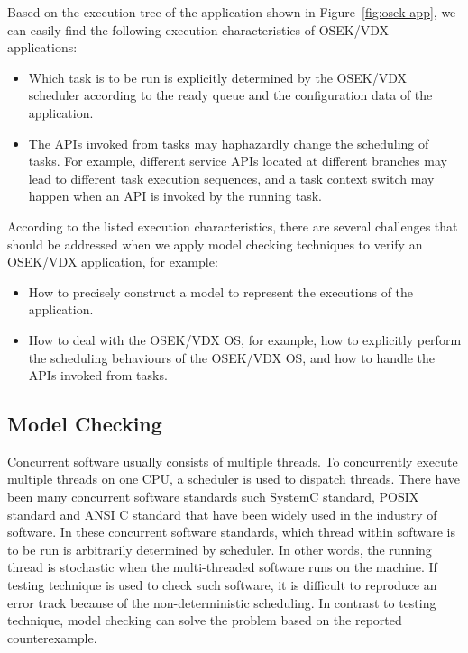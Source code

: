 Based on the execution tree of the application shown in Figure~\ref{fig:osek-app}, we can easily find the following execution characteristics of OSEK/VDX applications:

\begin{itemize}
    \item Which task is to be run is explicitly determined by the OSEK/VDX scheduler according to the ready queue and the configuration data of the application.

    \item The APIs invoked from tasks may haphazardly change the scheduling of tasks. For example, different service APIs located at different branches may lead to different task execution sequences, and a task context switch may happen when an API is invoked by the running task.
\end{itemize}

According to the listed execution characteristics, there are several challenges that should be addressed when we apply model checking techniques to verify an OSEK/VDX application, for example:

\begin{itemize}
    \item How to precisely construct a model to represent the executions of the application.

    \item How to deal with the OSEK/VDX OS, for example, how to explicitly perform the scheduling behaviours of the OSEK/VDX OS, and how to handle the APIs invoked from tasks.
\end{itemize}

\subsection{Model Checking}

Concurrent software usually consists of multiple threads. To concurrently execute multiple threads on one CPU, a scheduler is used to dispatch threads. There have been many concurrent software standards such SystemC standard, POSIX standard and ANSI C standard that have been widely used in the industry of software. In these concurrent software standards, which thread within software is to be run is arbitrarily determined by scheduler. In other words, the running thread is stochastic when the multi-threaded software runs on the machine. If testing technique is used to check such software, it is difficult to reproduce an error track because of the non-deterministic scheduling. In contrast to testing technique, model checking can solve the problem based on the reported counterexample. 

